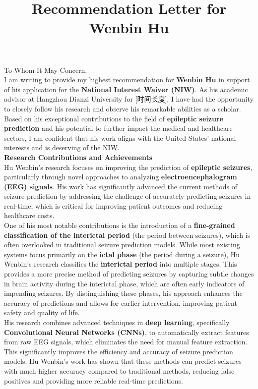 \documentclass[a4paper,12pt]{article}
\title{Recommendation Letter for Wenbin Hu}
\author{}
\date{}
\begin{document}
\maketitle

To Whom It May Concern,\\[1em]

I am writing to provide my highest recommendation for {\bf Wenbin Hu} in support of his application for the {\bf National Interest Waiver (NIW)}. As his academic advisor at Hangzhou Dianzi University for [时间长度], I have had the opportunity to closely follow his research and observe his remarkable abilities as a scholar. Based on his exceptional contributions to the field of {\bf epileptic seizure prediction} and his potential to further impact the medical and healthcare sectors, I am confident that his work aligns with the United States' national interests and is deserving of the NIW.\\[1em]

{\bf Research Contributions and Achievements}\\[1em]
Hu Wenbin's research focuses on improving the prediction of {\bf epileptic seizures}, particularly through novel approaches to analyzing {\bf electroencephalogram (EEG) signals}. His work has significantly advanced the current methods of seizure prediction by addressing the challenge of accurately predicting seizures in real-time, which is critical for improving patient outcomes and reducing healthcare costs.\\[1em]

One of his most notable contributions is the introduction of a {\bf fine-grained classification of the interictal period} (the period between seizures), which is often overlooked in traditional seizure prediction models. While most existing systems focus primarily on the {\bf ictal phase} (the period during a seizure), Hu Wenbin’s research classifies the {\bf interictal period} into multiple stages. This provides a more precise method of predicting seizures by capturing subtle changes in brain activity during the interictal phase, which are often early indicators of impending seizures. By distinguishing these phases, his approach enhances the accuracy of predictions and allows for earlier intervention, improving patient safety and quality of life.\\[1em]

His research combines advanced techniques in {\bf deep learning}, specifically {\bf Convolutional Neural Networks (CNNs)}, to automatically extract features from raw EEG signals, which eliminates the need for manual feature extraction. This significantly improves the efficiency and accuracy of seizure prediction models. Hu Wenbin’s work has shown that these methods can predict seizures with much higher accuracy compared to traditional methods, reducing false positives and providing more reliable real-time predictions.\\[1em]
\end{document}
